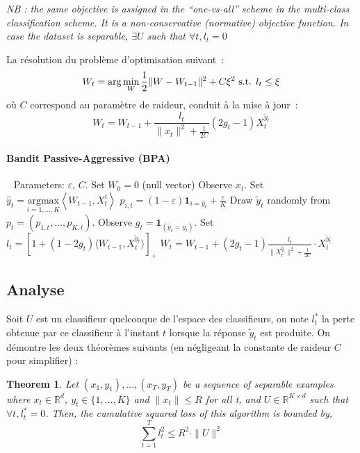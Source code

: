 \documentclass[preprint,12pt,authoryear]{elsarticle}
\newtheorem{theorem}{Theorem}
\begin{document}
\emph{NB : the same objective is assigned in the ``one-vs-all'' scheme in the multi-class classification scheme. It is a non-conservative (normative) objective function. In case the dataset is separable, $\exists U$ such that $\forall t, l_t = 0$  }

La résolution du problème d'optimisation suivant~:
$$W_{t} = \arg \min_W \frac{1}{2} \| W - W_{t-1}\|^2 + C \xi^2 \hbox{ s.t. } l_t \leq \xi$$
où $C$ correspond au paramètre de raideur, conduit à la mise à jour~:
$$W_{t} =  W_{t-1} + \frac{l_t}{\|x_t\|^2 + \frac{1}{2C}} (2g_t - 1) X_t^{\tilde{y}_t}$$

\paragraph{Bandit Passive-Aggressive (BPA)}
\begin{algorithmic}
	\STATE $\ \ $
	\STATE Parameters:  $\varepsilon$, $C$.
	\STATE Set $W_0 = 0$ (null vector)
	\STATE Observe $x_t$.
	\STATE Set $\hat{y}_t = \underset{i = 1,\dots,K}{\text{argmax}}\left\langle W_{t-1} ,X_t^i\right\rangle$
	\STATE $p_{i,t}= (1-\varepsilon)\mathbf{1}_{i = \hat{y}_t} + \frac{\varepsilon}{K}$
	\ENDFOR
	\STATE Draw $\tilde{y}_t$ randomly from $p_t = \left(p_{1,t},\dots ,p_{K,t}\right)$.
	\STATE Observe $g_t = \mathbf{1}_{(\tilde{y}_t=y_t)}$.
	\STATE Set $l_t = \left[ 1+(1-2g_t)\langle W_{t-1},X_t^{\tilde{y}_t}\rangle\right]_{+}$ 
	\STATE $W_t = W_{t-1} + (2g_t-1)\frac{l_t}{\parallel X_t^{\tilde{y}_t}\parallel^2 + \frac{1}{2C}}\cdot X_t^{\tilde{y}_t}$
	\ENDFOR
\end{algorithmic}


\subsection{Analyse}
Soit $U$ est un classifieur quelconque de l'espace des classifieurs, on note $l_t^{\ast}$ la perte obtenue par ce classifieur à l'instant $t$ lorsque la réponse $\tilde{y}_t$ est produite. On démontre les deux théorèmes suivants (en négligeant la constante de raideur $C$ pour simplifier) :

\begin{theorem}
	\label{theo:BPAT1}
	Let $(x_1,y_1),...,(x_T,y_T)$ be a sequence of separable examples where $x_t \in \mathbb{R}^d$, $y_t\in \{1,...,K\}$ and $\parallel x_t \parallel\leqslant R$ for all t, and $U \in \mathbb{R}^{K\times d}$ such that $ \forall t, l^*_t=0$. Then, the cumulative squared loss of this algorithm is bounded by,
	\begin{equation}
	\sum_{t=1}^{T} l_t^2 \leqslant R^2\cdot \parallel{U}\parallel^2
	\end{equation}
\end{theorem}
\end{document}
